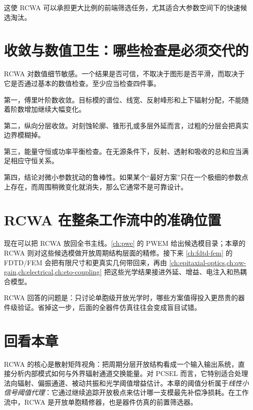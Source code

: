 这使 RCWA 可以承担更大比例的前端筛选任务，尤其适合大参数空间下的快速候选淘汰。

\section{收敛与数值卫生：哪些检查是必须交代的}
RCWA 对数值细节敏感。一个结果是否可信，不取决于图形是否平滑，而取决于它是否通过基本的数值检查。至少应当检查四件事。

第一，傅里叶阶数收敛。目标模的谱位、线宽、反射峰形和上下辐射分配，不能随着阶数增加继续大幅变化。

第二，纵向分层收敛。对刻蚀轮廓、锥形孔或多层外延而言，过粗的分层会把真实边界模糊掉。

第三，能量守恒或功率平衡检查。在无源条件下，反射、透射和吸收的总和应当满足相应守恒关系。

第四，结论对微小参数扰动的鲁棒性。如果某个“最好方案”只在一个极细的参数点上存在，而周围稍微变化就消失，那么它通常不是可靠设计。

\section{RCWA 在整条工作流中的准确位置}
现在可以把 RCWA 放回全书主线。\cref{ch:pwe} 的 PWEM 给出候选模目录；本章的 RCWA 则对这些候选模做开放周期结构层面的精修。接下来 \cref{ch:fdtd-fem} 的 FDTD/FEM 会把有限尺寸和更真实几何带回来，再由 \cref{ch:epitaxial-optics,ch:qw-gain,ch:electrical,ch:eto-coupling} 把这些光学结果接进外延、增益、电注入和热耦合模型。

RCWA 回答的问题是：只讨论单胞级开放光学时，哪些方案值得投入更昂贵的器件级验证。省掉这一步，后面的全器件仿真往往会变成盲目试错。

\section*{回看本章}
RCWA 的核心是散射矩阵视角：把周期分层开放结构看成一个输入输出系统，直接分析内部模式如何与外界辐射通道交换能量。对 PCSEL 而言，它特别适合处理法向辐射、偏振通道、被动共振和光学阈值增益估计。本章的阈值分析属于\emph{线性小信号阈值代理}：它通过继续追踪开放极点来估计哪一支模最先补偿净损耗。在工作流中，RCWA 是开放单胞精修器，也是器件仿真的前置筛选器。


